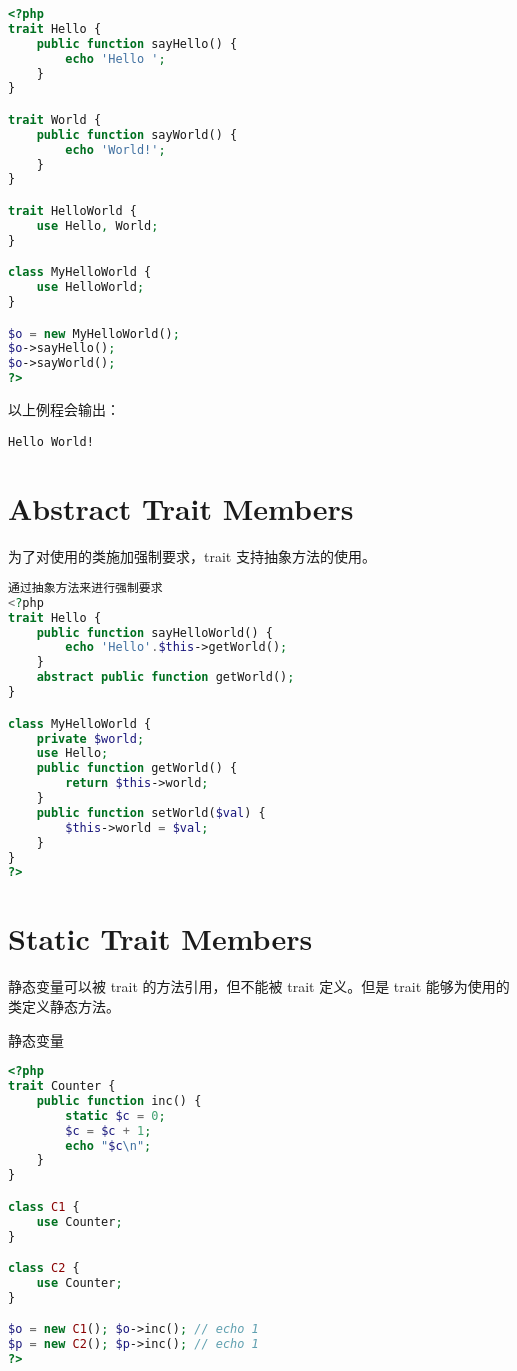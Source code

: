 \begin{lstlisting}[language=PHP]
<?php
trait Hello {
    public function sayHello() {
        echo 'Hello ';
    }
}

trait World {
    public function sayWorld() {
        echo 'World!';
    }
}

trait HelloWorld {
    use Hello, World;
}

class MyHelloWorld {
    use HelloWorld;
}

$o = new MyHelloWorld();
$o->sayHello();
$o->sayWorld();
?>
\end{lstlisting}

以上例程会输出：

\begin{verbatim}
Hello World!
\end{verbatim}




\section{Abstract Trait Members}



为了对使用的类施加强制要求，trait 支持抽象方法的使用。



\begin{lstlisting}[language=PHP]
通过抽象方法来进行强制要求
<?php
trait Hello {
    public function sayHelloWorld() {
        echo 'Hello'.$this->getWorld();
    }
    abstract public function getWorld();
}

class MyHelloWorld {
    private $world;
    use Hello;
    public function getWorld() {
        return $this->world;
    }
    public function setWorld($val) {
        $this->world = $val;
    }
}
?>
\end{lstlisting}






\section{Static Trait Members}

静态变量可以被 trait 的方法引用，但不能被 trait 定义。但是 trait 能够为使用的类定义静态方法。

\begin{example}
静态变量
\begin{lstlisting}[language=PHP]
<?php
trait Counter {
    public function inc() {
        static $c = 0;
        $c = $c + 1;
        echo "$c\n";
    }
}

class C1 {
    use Counter;
}

class C2 {
    use Counter;
}

$o = new C1(); $o->inc(); // echo 1
$p = new C2(); $p->inc(); // echo 1
?>
\end{lstlisting}
\end{example}

